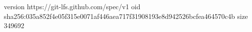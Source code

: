 version https://git-lfs.github.com/spec/v1
oid sha256:035a852f4e05f315e0071af446aea717f31908193e8d942526bcfea464570c4b
size 349692
